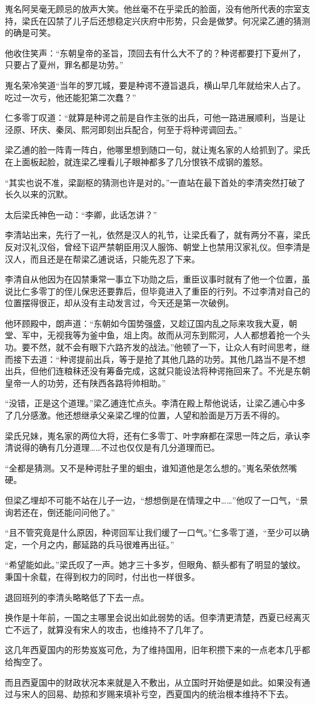 嵬名阿吴毫无顾忌的放声大笑。他丝毫不在乎梁氏的脸面，没有他所代表的宗室支持，梁氏在囚禁了儿子后还想稳定兴庆府中形势，只会是做梦。何况梁乙逋的猜测的确是可笑。

他收住笑声：“东朝皇帝的圣旨，顶回去有什么大不了的？种谔都要打下夏州了，只要占了夏州，罪名都是功劳。”

嵬名荣冷笑道“当年的罗兀城，要是种谔不遵旨退兵，横山早几年就给宋人占了。吃过一次亏，他还能犯第二次蠢？”

仁多零丁叹道：“就算是种谔之前是自作主张的出兵，可他一路进展顺利，当是让泾原、环庆、秦凤、熙河即刻出兵配合，何至于将种谔调回去。”

梁乙逋的脸一阵青一阵白，他哪里想到随口一句，就让嵬名家的人给抓到了。梁氏在上面板起脸，就连梁乙埋看儿子眼神都多了几分恨铁不成钢的羞怒。

“其实也说不准，梁副枢的猜测也许是对的。”一直站在最下首处的李清突然打破了长久以来的沉默。

太后梁氏神色一动：“李卿，此话怎讲？”

李清站出来，先行了一礼，依然是汉人的礼节，让梁氏看了，就有两分不喜，梁氏反对汉礼汉俗，曾经下诏严禁朝臣用汉人服饰、朝堂上也禁用汉家礼仪。但李清是汉人，而且还是在帮梁乙逋说话，只能先忍了下来。

李清自从他因为在囚禁秉常一事立下功勋之后，重臣议事时就有了他一个位置，虽说比仁多零丁的侄儿保忠还要靠后，但毕竟进入了重臣的行列。不过李清对自己的位置摆得很正，却从没有主动发言过，今天还是第一次破例。

他环顾殿中，朗声道：“东朝如今国势强盛，又趁辽国内乱之际来攻我大夏，朝堂、军中，无视我等为釜中鱼，俎上肉。故而从河东到熙河，人人都想着抢一个头功。要不然，就不会有眼下六路齐发的战法。”他顿了一下，让众人有时间思考，继而接下去道：“种谔提前出兵，等于是抢了其他几路的功劳。其他几路当不是不想出兵，但他们连粮秣还没有筹备完成，这就只能设法将种谔拖回来了。不光是东朝皇帝一人的功劳，还有陕西各路将帅相助。”

“没错，正是这个道理。”梁乙逋连忙点头。李清在殿上帮他说话，让梁乙逋心中多了几分感激。他还想继承父亲梁乙埋的位置，人望和脸面是万万丢不得的。

梁氏兄妹，嵬名家的两位大将，还有仁多零丁、叶孛麻都在深思一阵之后，承认李清说得的确有几分道理……不过也仅仅是有几分道理而已。

“全都是猜测。又不是种谔肚子里的蛔虫，谁知道他是怎么想的。”嵬名荣依然嘴硬。

但梁乙埋却不可能不站在儿子一边，“想想倒是在情理之中……”他叹了一口气，“景询若还在，倒还能问问他了。”

“且不管究竟是什么原因，种谔回军让我们缓了一口气。”仁多零丁道，“至少可以确定，一个月之内，鄜延路的兵马很难再出征。”

“希望能如此。”梁氏叹了一声。她才三十多岁，但眼角、额头都有了明显的皱纹。秉国十余载，在得到权力的同时，付出也一样很多。

退回班列的李清头略略低了下去一点。

换作是十年前，一国之主哪里会说出如此弱势的话。但李清更清楚，西夏已经离灭亡不远了，就算没有宋人的攻击，也维持不了几年了。

这几年西夏国内的形势岌岌可危，为了维持国用，旧年积攒下来的一点老本几乎都给掏空了。

而且西夏国中的财政状况本来就是入不敷出，从立国时开始便是如此。如果没有通过与宋人的回易、劫掠和岁赐来填补亏空，西夏国内的统治根本维持不下去。

